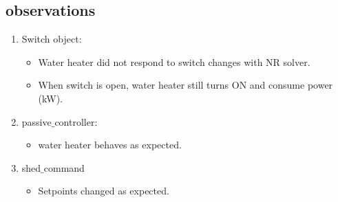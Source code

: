 \subsection{observations}
    \begin{enumerate}
        \item Switch object:
        \begin{itemize}
            \item Water heater did not respond to switch changes with NR solver.
            \item When switch is open, water heater still turns ON and consume power (kW).
    \end{itemize}
        \item passive$\_$controller:
        \begin{itemize}
            \item water heater behaves as expected.
        \end{itemize}
        \item shed$\_$command
        \begin{itemize}
            \item Setpoints changed as expected.
        \end{itemize}
    \end{enumerate}
\newpage
    
